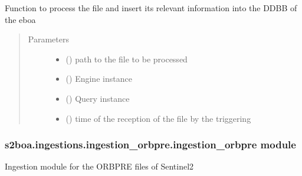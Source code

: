 \begin{fulllineitems}
\label{\detokenize{s2boa.ingestions:s2boa.ingestions.ingestion_nppf.ingestion_nppf.process_file}}
\sphinxAtStartPar
Function to process the file and insert its relevant information
into the DDBB of the eboa
\begin{quote}\begin{description}
\item[{Parameters}] \leavevmode\begin{itemize}
\item {} 
\sphinxAtStartPar
{} () \textendash{} path to the file to be processed

\item {} 
\sphinxAtStartPar
{} () \textendash{} Engine instance

\item {} 
\sphinxAtStartPar
{} () \textendash{} Query instance

\item {} 
\sphinxAtStartPar
{} () \textendash{} time of the reception of the file by the triggering

\end{itemize}

\end{description}\end{quote}

\end{fulllineitems}



\subsubsection{s2boa.ingestions.ingestion\_orbpre.ingestion\_orbpre module}
\label{\detokenize{s2boa.ingestions:module-s2boa.ingestions.ingestion_orbpre.ingestion_orbpre}}\label{\detokenize{s2boa.ingestions:s2boa-ingestions-ingestion-orbpre-ingestion-orbpre-module}}
\sphinxAtStartPar
Ingestion module for the ORBPRE files of Sentinel\sphinxhyphen{}2

